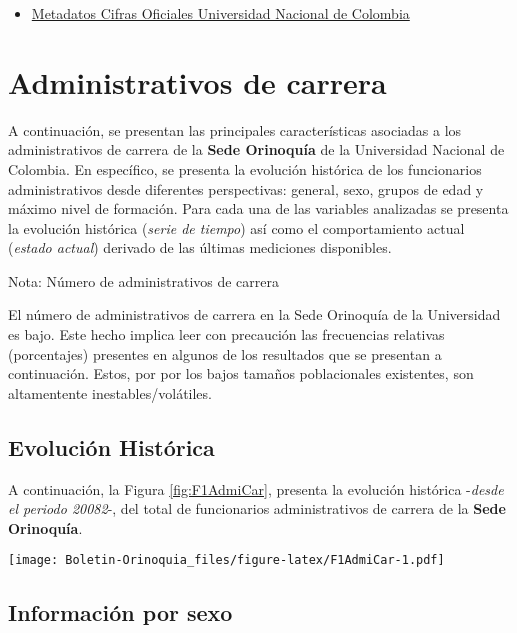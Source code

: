\documentclass[
]{book}
\providecommand{\tightlist}{%
  \setlength{\itemsep}{0pt}\setlength{\parskip}{0pt}}
\begin{document}
\begin{itemize}
\tightlist
\item
  \href{http://estadisticas.unal.edu.co/menu-principal/cifras-generales/metadatos/cifras-generales/}{Metadatos Cifras Oficiales Universidad Nacional de Colombia}
\end{itemize}

\hypertarget{AdmCar}{%
\section{Administrativos de carrera}\label{AdmCar}}

A continuación, se presentan las principales características asociadas a los administrativos de carrera de la \textbf{Sede Orinoquía} de la Universidad Nacional de Colombia. En específico, se presenta la evolución histórica de los funcionarios administrativos desde diferentes perspectivas: general, sexo, grupos de edad y máximo nivel de formación. Para cada una de las variables analizadas se presenta la evolución histórica (\emph{serie de tiempo}) así como el comportamiento actual (\emph{estado actual}) derivado de las últimas mediciones disponibles.

Nota: Número de administrativos de carrera

El número de administrativos de carrera en la Sede Orinoquía de la Universidad es bajo. Este hecho implica leer con precaución las frecuencias relativas (porcentajes) presentes en algunos de los resultados que se presentan a continuación. Estos, por por los bajos tamaños poblacionales existentes, son altamentente inestables/volátiles.

\hypertarget{evoluciuxf3n-histuxf3rica-7}{%
\subsection{Evolución Histórica}\label{evoluciuxf3n-histuxf3rica-7}}

A continuación, la Figura \ref{fig:F1AdmiCar}, presenta la evolución histórica -\emph{desde el periodo 20082}-, del total de funcionarios administrativos de carrera de la \textbf{Sede Orinoquía}.

\texttt{[image: Boletin-Orinoquia\_files/figure-latex/F1AdmiCar-1.pdf]}

\hypertarget{informaciuxf3n-por-sexo-7}{%
\subsection{Información por sexo}\label{informaciuxf3n-por-sexo-7}}
\end{document}
